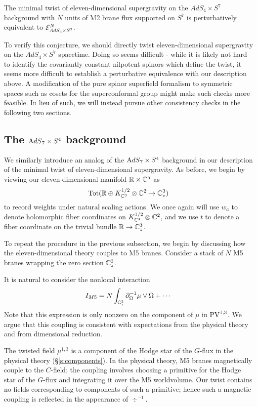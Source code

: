 \begin{conj}\label{conj:ads4}
The minimal twist of eleven-dimensional supergravity on the $AdS_4\times S^7$ background with $N$ units of M2 brane flux supported on $S^7$ is perturbatively equivalent to $\mathcal{E}^N_{AdS_4\times S^7}$.
\end{conj}

To verify this conjecture, we should directly twist eleven-dimensional supergravity on the $AdS_4\times S^7$ spacetime. Doing so seems difficult - while it is likely not hard to identify the covariantly constant nilpotent spinors which define the twist, it seems more difficult to establish a perturbative equivalence with our description above. A modification of the pure spinor superfield formalism to symmetric spaces such as cosets for the superconformal group might make such checks more feasible. In lieu of such, we will instead pursue other consistency checks in the following two sections{}. 

\subsection{The ${\mathrm{A}dS}_7 \times S^4$ background}

We similarly introduce an analog of the ${\mathrm{A}dS}_7 \times S^4$ background in our description of the minimal twist of eleven-dimensional supergravity. As before, we begin by viewing our eleven-dimensional manifold $\mathbb{R}\times \mathbb{C}^5$ as 
\[
\operatorname{Tot}(\mathbb{R} \oplus K_{\mathbb{C}^3}^{1/2}\otimes \mathbb{C}^2 \to \mathbb{C}^3_z)
\]
to record weights under natural scaling actions. We once again will use $w_a$ to denote holomorphic fiber coordinates on $K^{1/2}_{\mathbb{C}^3}\otimes \mathbb{C}^2$, and we use $t$ to denote a fiber coordinate on the trivial bundle $\mathbb{R} \to \mathbb{C}^3_z$.  


To repeat the procedure in the previous subsection, we begin by discussing how the eleven-dimensional theory couples to M5 branes. 
Consider a stack of $N$ M5 branes wrapping the zero section $\mathbb{C}^3_z$. 

It is natural to consider the nonlocal interaction 
\[
I_{M5} = N\int_{\mathbb{C}^3_z} \partial_{\Omega}^{-1}\mu \vee \Omega +\cdots 
\]
Note that this expression is only nonzero on the component of $\mu$ in $\text{PV}^{1,3}$. 
We argue that this coupling is consistent with expectations from the physical theory and from dimensional reduction. 

The twisted field $\mu^{1,3}$ is a component of the Hodge star of the $G$-flux in the physical theory (\S\ref{s:components}). 
In the physical theory, M5 branes magnetically couple to the $C$-field; the coupling involves choosing a primitive for the Hodge star of the $G$-flux and integrating it over the M5 worldvolume. Our twist contains no fields corresponding to components of such a primitive; hence such a magnetic coupling is reflected in the appearance of $\div^{-1}$. 

